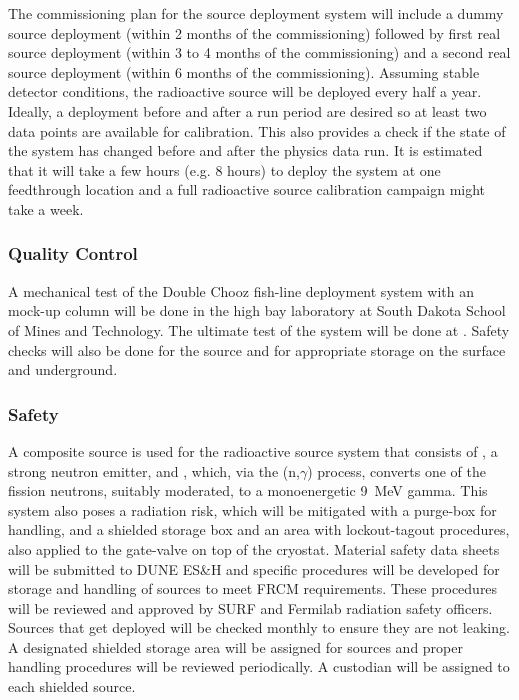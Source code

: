 The commissioning plan for the source deployment system will include a dummy source deployment (within 2 months of the commissioning) followed by first real source deployment (within 3 to 4 months of the commissioning) and a second real source deployment (within 6 months of the commissioning). Assuming stable detector conditions, the radioactive source will be deployed every half a year. Ideally, a deployment before and after a run period are desired so at least two data points are available for calibration. This also provides a check if the state of the system
has changed before and after the physics data run.
It is estimated that it will take a few hours (e.g. 8 hours) to deploy the system at one feedthrough location and a full radioactive source calibration campaign might take %
a week.

\subsubsection{Quality Control}
A mechanical test of the Double Chooz fish-line deployment system with an  mock-up column will be done in the high bay laboratory at South Dakota School of Mines and Technology. The ultimate test of the system will be done at . Safety checks will also be done for the source and for appropriate storage on the surface and underground. 

\subsubsection{Safety}
\label{sec:sp-calib-rsds-safety}
A composite source is used for the radioactive source system that consists  of , a strong neutron emitter, and , which, via the (n,$\gamma$) process, converts one of the  fission neutrons, suitably moderated, to a monoenergetic \SI{9}{\MeV} gamma. This system also poses a radiation risk, which will be mitigated with a purge-box for handling, and a shielded storage box and an area with lockout-tagout procedures, also applied to the gate-valve on top of the cryostat. Material safety data sheets will be submitted to DUNE ES\&H and specific procedures will be developed for storage and handling of sources to meet FRCM requirements. These procedures will be reviewed and approved by SURF and Fermilab radiation safety officers. Sources that get deployed will be checked monthly to ensure they are not leaking. A designated shielded storage area will be assigned for sources and proper handling procedures will be reviewed periodically. A custodian will be assigned to each shielded source.